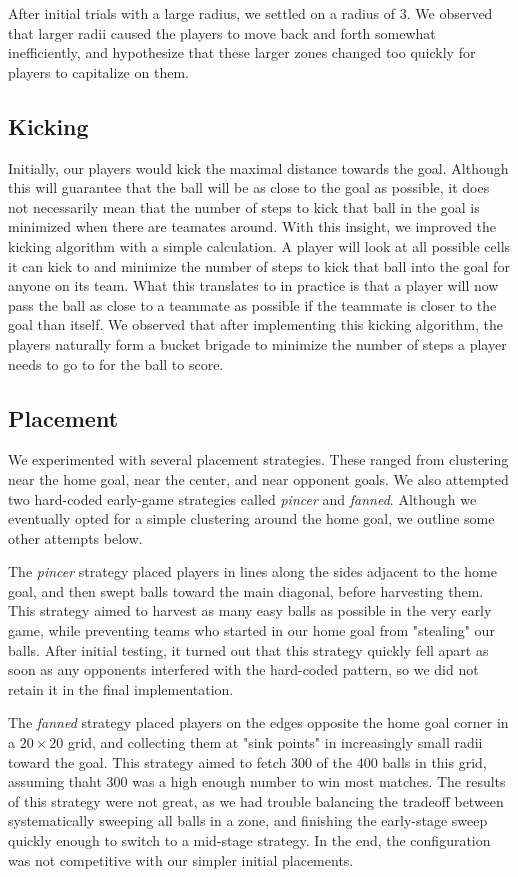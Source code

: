 \documentclass[
10pt, %
letterpaper, %
oneside, %
headinclude,footinclude, %
english
]{article}
\begin{document}
After initial trials with a large radius, we settled on a radius of 3. We observed that larger radii caused the players to move back and forth somewhat inefficiently, and hypothesize that these larger zones changed too quickly for players to capitalize on them.

\subsection{Kicking}
Initially, our players would kick the maximal distance towards the goal. Although this will guarantee that the ball will be as close to the goal as possible, it does not necessarily mean that the number of steps to kick that ball in the goal is minimized when there are teamates around. With this insight, we improved the kicking algorithm with a simple calculation. A player will look at all possible cells it can kick to and minimize the number of steps to kick that ball into the goal for anyone on its team. What this translates to in practice is that a player will now pass the ball as close to a teammate as possible if the teammate is closer to the goal than itself. We observed that after implementing this kicking algorithm, the players naturally form a bucket brigade to minimize the number of steps a player needs to go to for the ball to score.

\subsection{Placement} 
We experimented with several placement strategies. These ranged from clustering near the home goal, near the center, and near opponent goals. We also attempted two hard-coded early-game strategies called \emph{pincer} and \emph{fanned}. Although we eventually opted for a simple clustering around the home goal, we outline some other attempts below.

The \emph{pincer} strategy placed players in lines along the sides adjacent to the home goal, and then swept balls toward the main diagonal, before harvesting them. This strategy aimed to harvest as many easy balls as possible in the very early game, while preventing teams who started in our home goal from "stealing" our balls. After initial testing, it turned out that this strategy quickly fell apart as soon as any opponents interfered with the hard-coded pattern, so we did not retain it in the final implementation. 

The \emph{fanned} strategy placed players on the edges opposite the home goal corner in a $20 \times 20$ grid, and collecting them at "sink points" in increasingly small radii toward the goal. This strategy aimed to fetch 300 of the 400 balls in this grid, assuming thaht 300 was a high enough number to win most matches. The results of this strategy were not great, as we had trouble balancing the tradeoff between systematically sweeping all balls in a zone, and finishing the early-stage sweep quickly enough to switch to a mid-stage strategy. In the end, the configuration was not competitive with our simpler initial placements.
\end{document}
